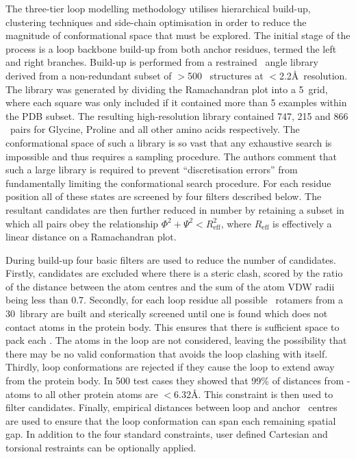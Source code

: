 The three-tier loop modelling methodology utilises  hierarchical build-up, clustering techniques and side-chain optimisation in order to reduce the magnitude of conformational space that must be explored.
The initial stage of the process is a loop backbone build-up from both anchor residues, termed the left and right branches. Build-up is performed from a restrained \phipsi\ angle library derived from a non-redundant subset of $>$500 \xray\ structures at $<$2.2\AA\ resolution. The library was generated by dividing the Ramachandran plot into a 5\degree\ grid, where each square was only included if it contained more than 5 examples within the PDB subset. The resulting high-resolution library contained 747, 215 and 866 \phipsi\ pairs for Glycine, Proline and all other amino acids respectively. The conformational space of such a library is so vast that any exhaustive search is impossible and thus requires a sampling procedure. The authors comment that such a large library is required to prevent ``discretisation errors'' from fundamentally limiting the conformational search procedure. For each residue position all of these states are screened by four filters described below. The resultant candidates are then further reduced in number by retaining a subset in which all pairs obey the relationship $\Phi^{2}+\Psi^{2}<R^{2}_\mathrm{eff}$, where $R_\mathrm{eff}$ is effectively a linear distance on a Ramachandran plot. 

During build-up four basic filters are used to reduce the number of candidates. Firstly, candidates are excluded where there is a steric clash, scored by the ratio of the distance between the atom centres and the sum of the atom VDW radii being less than 0.7. Secondly, for each loop residue all possible \sidechain\ rotamers from a 30\degree\ library are built and sterically screened until one is found which does not contact atoms in the protein body. This ensures that there is sufficient space to pack each \sidechain. The atoms in the loop are not considered, leaving the possibility that there may be no valid conformation that avoids the loop clashing with itself. Thirdly, loop conformations are rejected if they cause the loop to extend away from the protein body. In 500 test cases they showed that 99\% of distances from \ca-atoms to all other protein atoms are $<$6.32\AA. This constraint is then used to filter candidates. Finally, empirical distances between loop and anchor \ca\ centres are used to ensure that the loop conformation can span each remaining spatial gap. In addition to the four standard constraints, user defined Cartesian and torsional restraints can be optionally applied.

